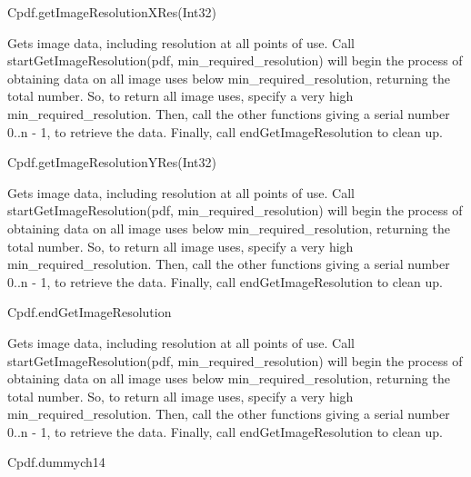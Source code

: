 Cpdf.getImageResolutionXRes(Int32)

Gets image data, including resolution at all points of use. Call
startGetImageResolution(pdf, min_required_resolution) will begin the
process of obtaining data on all image uses below min_required_resolution, 
returning the total number. So, to return all image uses, specify a very
high min_required_resolution. Then, call the other functions giving a
serial number 0..n - 1, to retrieve the data. Finally, call
endGetImageResolution to clean up.

Cpdf.getImageResolutionYRes(Int32)

Gets image data, including resolution at all points of use. Call
startGetImageResolution(pdf, min_required_resolution) will begin the
process of obtaining data on all image uses below min_required_resolution, 
returning the total number. So, to return all image uses, specify a very
high min_required_resolution. Then, call the other functions giving a
serial number 0..n - 1, to retrieve the data. Finally, call
endGetImageResolution to clean up.

Cpdf.endGetImageResolution

Gets image data, including resolution at all points of use. Call
startGetImageResolution(pdf, min_required_resolution) will begin the
process of obtaining data on all image uses below min_required_resolution, 
returning the total number. So, to return all image uses, specify a very
high min_required_resolution. Then, call the other functions giving a
serial number 0..n - 1, to retrieve the data. Finally, call
endGetImageResolution to clean up.

Cpdf.dummych14

